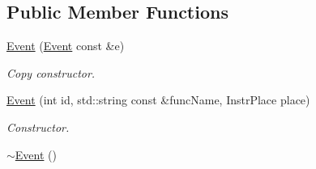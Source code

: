 \subsection*{Public Member Functions}
\begin{DoxyCompactItemize}
\item 
\hyperlink{class_model_1_1_event_afcfebfa23d6c60c3632528aa58805617}{Event} (\hyperlink{class_model_1_1_event}{Event} const \&e)
\begin{DoxyCompactList}\small\item\em Copy constructor. \end{DoxyCompactList}\item 
\hyperlink{class_model_1_1_event_a0f311fa972df39b141bfdb8291f9d477}{Event} (int id, std\-::string const \&func\-Name, Instr\-Place place)
\begin{DoxyCompactList}\small\item\em Constructor. \end{DoxyCompactList}\item 
\hypertarget{class_model_1_1_event_a7704ec01ce91e673885792054214b3d2}{\hyperlink{class_model_1_1_event_a7704ec01ce91e673885792054214b3d2}{$\sim$\-Event} ()}\label{class_model_1_1_event_a7704ec01ce91e673885792054214b3d2}


\end{DoxyCompactItemize}
